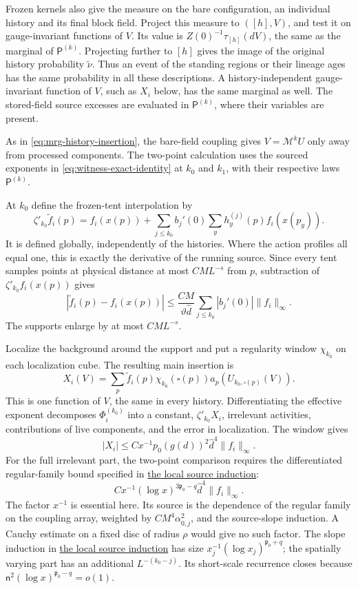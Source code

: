 \documentclass[11pt,letterpaper,reqno]{amsart}
\theoremstyle{definition}
\theoremstyle{remark}
\begin{document}
Frozen kernels also give the measure on the bare configuration, an
individual history and its final block field. Project this measure
to $([h],V)$, and test it on gauge-invariant functions of $V$.
Its value is $Z(0)^{-1}\tau_{[h]}(dV)$, the same as the marginal of
$\mathsf P^{(k)}$. Projecting further to $[h]$ gives the image of
the original history probability $\widetilde\nu$. Thus an event of
the standing regions or their lineage ages has the same probability
in all these descriptions. A history-independent gauge-invariant
function of $V$, such as $X_i$ below, has the same marginal as well.
The stored-field source excesses are evaluated in $\mathsf P^{(k)}$,
where their variables are present.

As in \eqref{eq:mrg-history-insertion}, the bare-field coupling gives
$V=\mathcal M^kU$ only away from processed components. The two-point
calculation uses the sourced exponents in \eqref{eq:witness-exact-identity}
at $k_0$ and $k_1$, with their respective laws $\mathsf P^{(k)}$.

At $k_0$ define the frozen-tent interpolation by
\[
 \zeta'_{k_0}\tilde f_i(p)
   =f_i(x(p))+\sum_{j\le k_0}b_j'(0)
                           \sum_yh_y^{(j)}(p)f_i(x(p_y)).
\]
It is defined globally, independently of the histories. Where the action
profiles all equal one, this is exactly the derivative of the running
source. Since every tent samples points at physical distance at most
$CML^{-s}$ from $p$, subtraction of
$\zeta'_{k_0}f_i(x(p))$ gives
\[
 |\tilde f_i(p)-f_i(x(p))|
     \le\frac{CM}{\vartheta\hat d}
                   \sum_{j\le k_0}|b_j'(0)|\|f_i\|_\infty.
\]
The supports enlarge by at most $CML^{-s}$.

Localize the background around the support and put a regularity window
$\chi_{k_0}$ on each localization cube. The resulting main insertion is
\[
 X_i(V)=\sum_p\tilde f_i(p)\chi_{k_0}(\square(p))
                         a_p(U_{k_0,\square(p)}(V)).
\]
This is one function of $V$, the same in every history. Differentiating
the effective exponent decomposes $\Phi_i^{(k_0)}$ into a constant,
$\zeta'_{k_0}X_i$, irrelevant activities, contributions of live
components, and the error in localization. The window gives
\[
 |X_i|\le Cx^{-1}p_0(g(d))^2\hat d^4\|f_i\|_\infty.
\]
For the full irrelevant part, the two-point comparison requires the
differentiated regular-family bound specified in
\hyperref[hyp:sourced-estimates]{the local source induction}:
\begin{equation}\label{eq:witness-source-slope}
 Cx^{-1}(\log x)^{3\mathfrak p_0-q}
                           \hat d^4\|f_i\|_\infty.
\end{equation}
The factor $x^{-1}$ is essential here. Its source is the dependence of
the regular family on the coupling array, weighted by
$CM^4\alpha_{0,j}^2$, and the source-slope induction. A Cauchy
estimate on a fixed disc of radius $\rho$ would give no such factor.
The slope induction in \hyperref[hyp:sourced-estimates]{the local source induction} has size
$x_j^{-1}(\log x_j)^{\mathfrak p_0+q}$; the spatially varying part
has an additional $L^{-(k_0-j)}$. Its short-scale recurrence closes
because $\mathsf n^2(\log x)^{\mathfrak p_0-q}=o(1)$.
\end{document}
